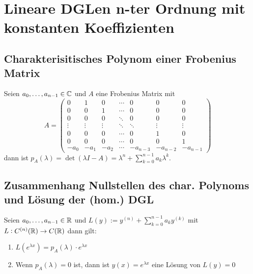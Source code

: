 \section{Lineare DGLen n-ter Ordnung mit konstanten Koeffizienten}
\subsection{Charakterisitisches Polynom einer Frobenius Matrix}
Seien $a_0, \ldots, a_{n-1} \in \mathbb{C}$ und $A$ eine Frobenius Matrix mit
\begin{equation*}
	A = \begin{pmatrix}
		0 & 1 & 0 & \cdots & 0 & 0 & 0 \\
		0 & 0 & 1 & \cdots & 0 & 0 & 0 \\
		0 & 0 & 0 & \ddots & 0 & 0 & 0 \\
		\vdots & \vdots & \vdots & \ddots & \ddots & \vdots & \vdots \\
		0 & 0 & 0 & \cdots & 0 & 1 & 0 \\
		0 & 0 & 0 & \cdots & 0 & 0 & 1 \\
		-a_0 & -a_1 & -a_2 & \cdots & -a_{n-3} & -a_{n-2} & -a_{n-1}
	\end{pmatrix}
\end{equation*}
dann ist $p_A(\lambda) = \det(\lambda I - A) = \lambda^n + \sum_{k=0}^{n-1} a_k \lambda^k$.

\subsection{Zusammenhang Nullstellen des char. Polynoms und Lösung der (hom.) DGL}
Seien $a_0, \ldots, a_{n-1} \in \mathbb{R}$ und $L(y) := y^{(n)} + \sum_{k=0}^{n-1} a_k y^{(k)}$ mit
$L: C^{(n)}(\mathbb{R}) \to C(\mathbb{R})$ dann gilt:
\begin{enumerate}[label= (\alph*)]
	\item $L(e^{\lambda x}) = p_A(\lambda) \cdot e^{\lambda x}$
	\item Wenn $p_A(\lambda) = 0$ ist, dann ist $y(x) = e^{\lambda x}$ eine Lösung von $L(y) = 0$
\end{enumerate}

